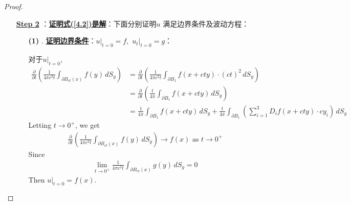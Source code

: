\begin{thm}
\begin{proof}
\begin{enumerate}
				\vspace*{4em}
				
				\item[\underline{\textbf{Step 2}}]：\underline{\textbf{证明式(\ref{4.2})是解}}：下面分别证明$u$ 满足边界条件及波动方程：
				
				\vspace*{1em}
				
				\begin{enumerate}
					\item[\textbf{(1)}]. \underline{\textbf{证明边界条件}}：$u\Big|_{t = 0} = f , \,\, u_t \Big|_{t = 0} = g$：
					
					\vspace*{1em}
					
					对于$u\Big|_{t = 0}$, 
					\begin{align*}
						\frac{\partial}{\partial t} \left( \frac{1}{4\pi c^2 t} \int_{\partial B_{ct}(x)} f(y) \, dS_y \right) 
						&= \frac{\partial}{\partial t} \left( \frac{1}{4\pi c^2 t} \int_{\partial B_1} f(x + cty) \cdot (ct)^2 \, dS_y \right) \\
						&= \frac{\partial}{\partial t} \left( \frac{t}{4\pi} \int_{\partial B_1} f(x + cty) \, dS_y \right) \\
						&= \frac{1}{4\pi} \int_{\partial B_1} f(x + cty) \, dS_y 
						+ \frac{t}{4\pi} \int_{\partial B_1} \left( \sum_{i = 1}^3 D_{i} f(x + cty) \cdot c y_i \right) \, dS_y
					\end{align*}
					Letting $t \to 0^+$, we get 
					\begin{align*}
						\frac{\partial}{\partial t} \left( \frac{1}{4\pi c^2 t} \int_{\partial B_{ct}(x)} f(y) \, dS_y \right) \to f(x) \,\, \text{as} \,\, t \to 0^+
					\end{align*}
					Since
					\begin{align*}
						\lim_{t \to 0^+} \frac{1}{4\pi c^2 t} \int_{\partial B_{ct}(x)} g(y) \, dS_y  
						= 0
					\end{align*}
					Then $u \Big|_{t = 0} = f(x)$. 
					
					\newpage
					

\end{enumerate}
\end{enumerate}
\end{proof}
\end{thm}

